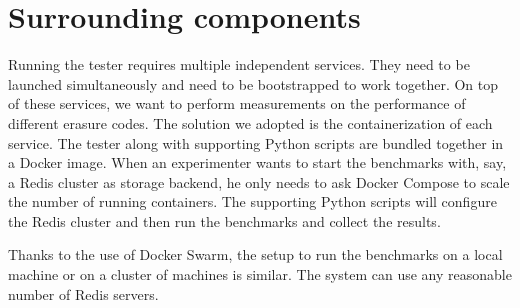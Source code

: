 \section{Surrounding components}

Running the tester requires multiple independent services.
They need to be launched simultaneously and need to be bootstrapped to work together.
On top of these services, we want to perform measurements on the performance of different erasure codes.
The solution we adopted is the containerization of each service.
The tester along with supporting Python scripts are bundled together in a Docker image.
When an experimenter wants to start the benchmarks with, say, a Redis cluster as storage backend, he only needs to ask Docker Compose to scale the number of running containers.
The supporting Python scripts will configure the Redis cluster and then run the benchmarks and collect the results.

Thanks to the use of Docker Swarm, the setup to run the benchmarks on a local machine or on a cluster of machines is similar.
The system can use any reasonable number of Redis servers.
